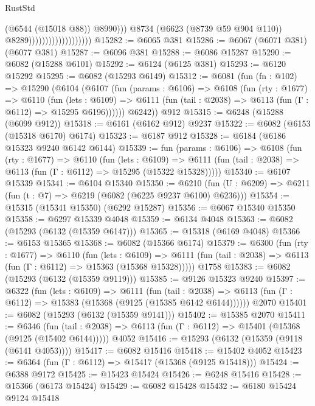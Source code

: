 \begin{lexlean}{RustStd}
\begin{coremodule}
                                                (@6544 (@15018 @88))
                                                @8990)))
                                          @8734
                                          (@6623 (@8739 @59 @904 @110))
                                          @8289)))))))))))))))))))
@15282 := @6065 @381
@15286 := @6067 (@6071 @381) (@6077 @381)
@15287 := @6096 @381
@15288 := @6086 @15287
@15290 := @6082 (@15288 @6101)
@15292 := @6124 (@6125 @381)
@15293 := @6120 @15292
@15295 := @6082 (@15293 @6149)
@15312 := @6081
    (fun (fn : @102) =>
    @15290
      (@6104
        (@6107
          (fun (params : @6106) =>
          @6108
            (fun (rty : @1677) =>
            @6110
              (fun (lets : @6109) =>
              @6111 (fun (tail : @2038) => @6113 (fun (Γ : @6112) => @15295 @6196))))))
        @6242))
    @912
@15315 := @6248 (@15288 (@6099 @912))
@15318 := @6161 (@6162 @912) @9237
@15322 := @6082 (@6153 (@15318 @6170) @6174)
@15323 := @6187 @912
@15328 := @6184 (@6186 @15323 @9240 @6142 @6144)
@15339 := fun (params : @6106) =>
  @6108
    (fun (rty : @1677) =>
    @6110
      (fun (lets : @6109) =>
      @6111 (fun (tail : @2038) => @6113 (fun (Γ : @6112) => @15295 (@15322 @15328)))))
@15340 := @6107 @15339
@15341 := @6104 @15340
@15350 := @6210 (fun (U : @6209) => @6211 (fun (t : @7) => @6219 (@6082 (@6225 @9237 @6100) @6236)))
@15354 := @15315 (@15341 @15350) (@6292 @15287)
@15356 := @6067 @15340 @15350
@15358 := @6297 @15339 @4048
@15359 := @6134 @4048
@15363 := @6082 (@15293 (@6132 (@15359 @6147)))
@15365 := @15318 (@6169 @4048)
@15366 := @6153 @15365
@15368 := @6082 (@15366 @6174)
@15379 := @6300
    (fun (rty : @1677) =>
    @6110
      (fun (lets : @6109) =>
      @6111 (fun (tail : @2038) => @6113 (fun (Γ : @6112) => @15363 (@15368 @15328)))))
    @1758
@15383 := @6082 (@15293 (@6132 (@15359 @9119)))
@15385 := @9126 @15323 @9240
@15397 := @6322
    (fun (lets : @6109) =>
    @6111
      (fun (tail : @2038) =>
      @6113 (fun (Γ : @6112) => @15383 (@15368 (@9125 (@15385 @6142 @6144))))))
    @2070
@15401 := @6082 (@15293 (@6132 (@15359 @9141)))
@15402 := @15385 @2070
@15411 := @6346
    (fun (tail : @2038) => @6113 (fun (Γ : @6112) => @15401 (@15368 (@9125 (@15402 @6144)))))
    @4052
@15416 := @15293 (@6132 (@15359 (@9118 (@6141 @4053))))
@15417 := @6082 @15416
@15418 := @15402 @4052
@15423 := @6364 (fun (Γ : @6112) => @15417 (@15368 (@9125 @15418)))
@15424 := @6388 @9172
@15425 := @15423 @15424
@15426 := @6248 @15416
@15428 := @15366 (@6173 @15424)
@15429 := @6082 @15428
@15432 := @6180 @15424 @9124 @15418

\end{coremodule}
\end{lexlean}
